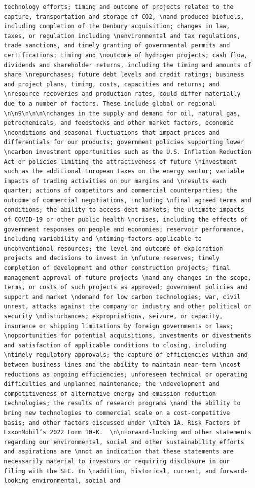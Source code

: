 \documentclass[
  letterpaper,
  DIV=11,
  numbers=noendperiod]{scrreprt}
\begin{document}
\begin{verbatim}
technology efforts; timing and outcome of projects related to the capture, transportation and storage of CO2, \nand produced biofuels, including completion of the Denbury acquisition; changes in law, taxes, or regulation including \nenvironmental and tax regulations, trade sanctions, and timely granting of governmental permits and certifications; timing and \noutcome of hydrogen projects; cash flow, dividends and shareholder returns, including the timing and amounts of share \nrepurchases; future debt levels and credit ratings; business and project plans, timing, costs, capacities and returns; and \nresource recoveries and production rates, could differ materially due to a number of factors. These include global or regional \n\n9\n\n\n\nchanges in the supply and demand for oil, natural gas, petrochemicals, and feedstocks and other market factors, economic \nconditions and seasonal fluctuations that impact prices and differentials for our products; government policies supporting lower \ncarbon investment opportunities such as the U.S. Inflation Reduction Act or policies limiting the attractiveness of future \ninvestment such as the additional European taxes on the energy sector; variable impacts of trading activities on our margins and \nresults each quarter; actions of competitors and commercial counterparties; the outcome of commercial negotiations, including \nfinal agreed terms and conditions; the ability to access debt markets; the ultimate impacts of COVID-19 or other public health \ncrises, including the effects of government responses on people and economies; reservoir performance, including variability and \ntiming factors applicable to unconventional resources; the level and outcome of exploration projects and decisions to invest in \nfuture reserves; timely completion of development and other construction projects; final management approval of future projects \nand any changes in the scope, terms, or costs of such projects as approved; government policies and support and market \ndemand for low carbon technologies; war, civil unrest, attacks against the company or industry and other political or security \ndisturbances; expropriations, seizure, or capacity, insurance or shipping limitations by foreign governments or laws; \nopportunities for potential acquisitions, investments or divestments and satisfaction of applicable conditions to closing, including \ntimely regulatory approvals; the capture of efficiencies within and between business lines and the ability to maintain near-term \ncost reductions as ongoing efficiencies; unforeseen technical or operating difficulties and unplanned maintenance; the \ndevelopment and competitiveness of alternative energy and emission reduction technologies; the results of research programs \nand the ability to bring new technologies to commercial scale on a cost-competitive basis; and other factors discussed under \nItem 1A. Risk Factors of ExxonMobil’s 2022 Form 10-K.  \n\nForward-looking and other statements regarding our environmental, social and other sustainability efforts and aspirations are \nnot an indication that these statements are necessarily material to investors or requiring disclosure in our filing with the SEC. In \naddition, historical, current, and forward-looking environmental, social and 
\end{verbatim}
\end{document}
